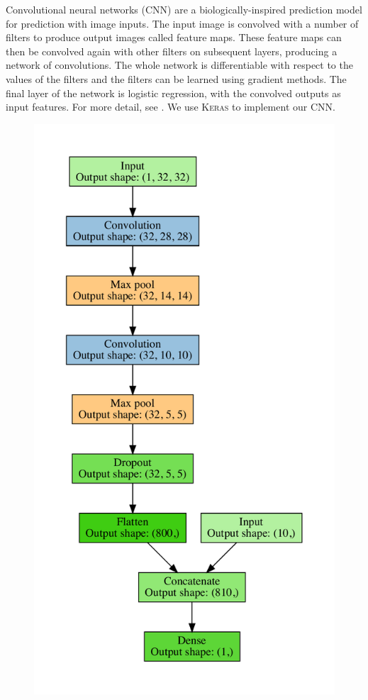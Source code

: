 \documentclass[fleqn,usenatbib,usedcolumn]{mnras}
\begin{document}
      Convolutional neural networks (CNN) are a biologically-inspired
      prediction model for prediction with image inputs. The input image is
      convolved with a number of filters to produce output images called
      feature maps. These feature maps can then be convolved again with other
      filters on subsequent layers, producing a network of convolutions. The
      whole network is differentiable with respect to the values of the
      filters and the filters can be learned using gradient methods. The final
      layer of the network is logistic regression, with the convolved outputs
      as input features. For more detail, see \citet[subsection
      II.A][]{lecun98}. We use \textsc{Keras} \citep{chollet15keras} to
      implement our CNN.

      \begin{figure}
        \includegraphics[width=\linewidth]{images/cnn_model_graph}

\end{figure}
\end{document}
